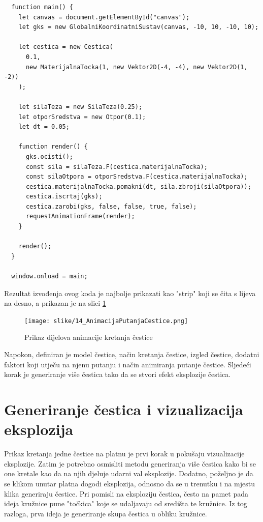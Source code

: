 \documentclass{foi}
\begin{document}
\begin{verbatim}
  function main() {
    let canvas = document.getElementById("canvas");
    let gks = new GlobalniKoordinatniSustav(canvas, -10, 10, -10, 10);

    let cestica = new Cestica(
      0.1,
      new MaterijalnaTocka(1, new Vektor2D(-4, -4), new Vektor2D(1, -2))
    );

    let silaTeza = new SilaTeza(0.25);
    let otporSredstva = new Otpor(0.1);
    let dt = 0.05;

    function render() {
      gks.ocisti();
      const sila = silaTeza.F(cestica.materijalnaTocka);
      const silaOtpora = otporSredstva.F(cestica.materijalnaTocka);
      cestica.materijalnaTocka.pomakni(dt, sila.zbroji(silaOtpora));
      cestica.iscrtaj(gks);
      cestica.zarobi(gks, false, false, true, false);
      requestAnimationFrame(render);
    }

    render();
  }

  window.onload = main;
\end{verbatim}
Rezultat izvođenja ovog koda je najbolje prikazati kao "strip" koji se čita s lijeva na desno, a prikazan je na slici \ref{fig:AnimacijaPutanjaCestice}

\begin{figure}[H]
    \centering
    \texttt{[image: slike/14\_AnimacijaPutanjaCestice.png]}
    \captionsetup{justification=centering}
    \caption{Prikaz dijelova animacije kretanja čestice}
\label{fig:AnimacijaPutanjaCestice}
\end{figure}

Napokon, definiran je model čestice, način kretanja čestice, izgled čestice, dodatni faktori koji utječu na njenu putanju i način animiranja putanje čestice. Sljedeći korak je generiranje više čestica tako da se stvori efekt eksplozije čestica. 

\section{Generiranje čestica i vizualizacija eksplozija}
Prikaz kretanja jedne čestice na platnu je prvi korak u pokušaju vizualizacije eksplozije. Zatim je potrebno osmisliti metodu generiranja više čestica kako bi se one kretale kao da na njih djeluje udarni val eksplozije. Dodatno, poželjno je da se klikom unutar platna dogodi eksplozija, odnosno da se u trenutku i na mjestu klika generiraju čestice. Pri pomisli na eksploziju čestica, često na pamet pada ideja kružnice pune "točkica" koje se udaljavaju od središta te kružnice. Iz tog razloga, prva ideja je generiranje skupa čestica u obliku kružnice.
\end{document}
